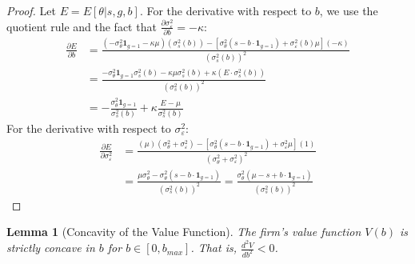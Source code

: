 \documentclass[12pt,a4paper]{article}
\newtheorem{lemma}{Lemma}
\theoremstyle{definition}
\theoremstyle{remark}
\begin{document}
\begin{proof}
Let $E = E[\theta | s, g, b]$. For the derivative with respect to $b$, we use the quotient rule and the fact that $\frac{\partial \sigma_\varepsilon^2}{\partial b} = -\kappa$:
\begin{align}
\frac{\partial E}{\partial b} &= \frac{(-\sigma_\theta^2 \mathbf{1}_{g=1} - \kappa \mu)(\sigma_s^2(b)) - [\sigma_\theta^2 (s - b \cdot \mathbf{1}_{g=1}) + \sigma_\varepsilon^2(b) \mu](-\kappa)}{(\sigma_s^2(b))^2} \\
&= \frac{-\sigma_\theta^2 \mathbf{1}_{g=1}\sigma_s^2(b) - \kappa \mu \sigma_s^2(b) + \kappa (E \cdot \sigma_s^2(b))}{(\sigma_s^2(b))^2} \\
&= -\frac{\sigma_\theta^2 \mathbf{1}_{g=1}}{\sigma_s^2(b)} + \kappa \frac{E - \mu}{\sigma_s^2(b)}
\end{align}
For the derivative with respect to $\sigma_\varepsilon^2$:
\begin{align}
\frac{\partial E}{\partial \sigma_\varepsilon^2} &= \frac{(\mu)(\sigma_\theta^2 + \sigma_\varepsilon^2) - [\sigma_\theta^2 (s - b \cdot \mathbf{1}_{g=1}) + \sigma_\varepsilon^2 \mu](1)}{(\sigma_\theta^2 + \sigma_\varepsilon^2)^2} \\
&= \frac{\mu \sigma_\theta^2 - \sigma_\theta^2 (s - b \cdot \mathbf{1}_{g=1})}{(\sigma_s^2(b))^2} = \frac{\sigma_\theta^2(\mu - s + b \cdot \mathbf{1}_{g=1})}{(\sigma_s^2(b))^2}
\end{align}
\end{proof}

\begin{lemma}[Concavity of the Value Function]
    \label{lemma:concavity}
    The firm's value function $V(b)$ is strictly concave in $b$ for $b \in [0, b_{max}]$. That is, $\frac{d^2V}{db^2} < 0$.
\end{lemma}
\end{document}

